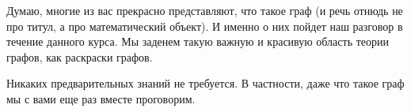 



Думаю, многие из вас прекрасно представляют, что такое граф
(и речь отнюдь не про титул, а про математический объект).
И именно о них пойдет наш разговор в течение данного курса.
Мы заденем такую важную и красивую область теории графов, как раскраски графов.

Никаких предварительных знаний не требуется.
В частности, даже что такое граф мы с вами еще раз вместе проговорим.


